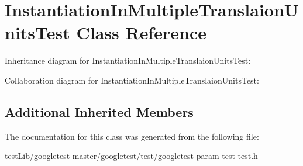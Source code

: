 \hypertarget{classInstantiationInMultipleTranslaionUnitsTest}{}\section{Instantiation\+In\+Multiple\+Translaion\+Units\+Test Class Reference}
\label{classInstantiationInMultipleTranslaionUnitsTest}


Inheritance diagram for Instantiation\+In\+Multiple\+Translaion\+Units\+Test\+:


Collaboration diagram for Instantiation\+In\+Multiple\+Translaion\+Units\+Test\+:
\subsection*{Additional Inherited Members}


The documentation for this class was generated from the following file\+:\begin{DoxyCompactItemize}
\item 
test\+Lib/googletest-\/master/googletest/test/googletest-\/param-\/test-\/test.\+h\end{DoxyCompactItemize}
